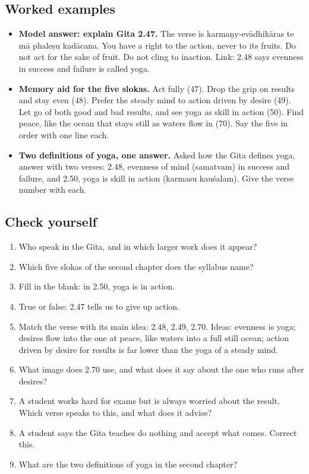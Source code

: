 \subsection*{Worked examples}
\begin{itemize}
\item \textbf{Model answer: explain Gita 2.47.} The verse is karmaṇy-evādhikāras te mā phaleṣu kadācana. You have a right to the action, never to its fruits. Do not act for the sake of fruit. Do not cling to inaction. Link: 2.48 says evenness in success and failure is called yoga.
\item \textbf{Memory aid for the five slokas.} Act fully (47). Drop the grip on results and stay even (48). Prefer the steady mind to action driven by desire (49). Let go of both good and bad results, and see yoga as skill in action (50). Find peace, like the ocean that stays still as waters flow in (70). Say the five in order with one line each.
\item \textbf{Two definitions of yoga, one answer.} Asked how the Gita defines yoga, answer with two verses: 2.48, evenness of mind (samatvam) in success and failure, and 2.50, yoga is skill in action (karmasu kauśalam). Give the verse number with each.
\end{itemize}

\subsection*{Check yourself}
\begin{enumerate}
\item Who speak in the Gita, and in which larger work does it appear?
\item Which five slokas of the second chapter does the syllabus name?
\item Fill in the blank: in 2.50, yoga is \underline{\hspace{2cm}} in action.
\item True or false: 2.47 tells us to give up action.
\item Match the verse with its main idea: 2.48, 2.49, 2.70. Ideas: evenness is yoga; desires flow into the one at peace, like waters into a full still ocean; action driven by desire for results is far lower than the yoga of a steady mind.
\item What image does 2.70 use, and what does it say about the one who runs after desires?
\item A student works hard for exams but is always worried about the result. Which verse speaks to this, and what does it advise?
\item A student says the Gita teaches do nothing and accept what comes. Correct this.
\item What are the two definitions of yoga in the second chapter?
\end{enumerate}

